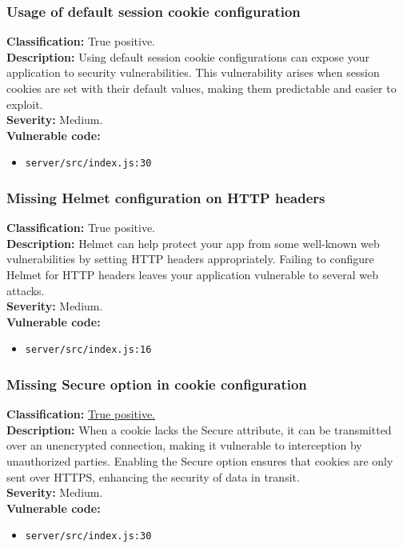 \documentclass[]{article}
\begin{document}
\subsubsection{Usage of default session cookie configuration}
\textbf{Classification:} True positive. \\
\textbf{Description:} Using default session cookie configurations can expose your application to security vulnerabilities. This vulnerability arises when session cookies are set with their default values, making them predictable and easier to exploit. \\ 
\textbf{Severity:} Medium. \\ 
\textbf{Vulnerable code:}
\begin{itemize}
    \item \texttt{server/src/index.js:30}
\end{itemize}

\subsubsection{Missing Helmet configuration on HTTP headers}
\textbf{Classification:} True positive. \\
\textbf{Description:} Helmet can help protect your app from some well-known web vulnerabilities by setting HTTP headers appropriately. Failing to configure Helmet for HTTP headers leaves your application vulnerable to several web attacks. \\ 
\textbf{Severity:} Medium. \\ 
\textbf{Vulnerable code:}
\begin{itemize}
    \item \texttt{server/src/index.js:16}
\end{itemize}

\subsubsection{Missing Secure option in cookie configuration}
\textbf{Classification:} \hyperref[subsubsec:sensitive_cookie_without_secure_and_httponly_attributes]{True positive.} \\
\textbf{Description:} When a cookie lacks the Secure attribute, it can be transmitted over an unencrypted connection, making it vulnerable to interception by unauthorized parties. Enabling the Secure option ensures that cookies are only sent over HTTPS, enhancing the security of data in transit. \\ 
\textbf{Severity:} Medium. \\ 
\textbf{Vulnerable code:}
\begin{itemize}
    \item \texttt{server/src/index.js:30}
\end{itemize}
\end{document}
